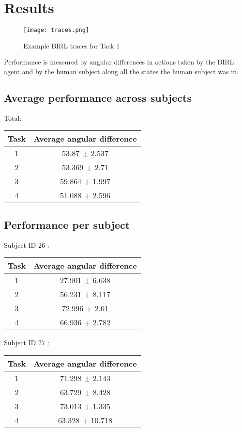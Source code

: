 \documentclass[12pt]{article}
\begin{document}
\section{Results}

\begin{figure}[h!]
    \centering
    \texttt{[image: traces.png]}
    \caption{Example BIRL traces for Task 1}
    \label{traces}
\end{figure}


Performance is measured by angular differences in actions taken by the BIRL agent and by the human subject along all the states the human subject was in. \par 

\subsection{Average performance across subjects}

Total: 
\begin{center}
\begin{tabular}{|c|c|}
\hline
 Task & Average angular difference \\ \hline
1  &  53.87 $\pm$ 2.537 \\
2  &  53.369 $\pm$ 2.71 \\
3  &  59.864 $\pm$ 1.997 \\
4  &  51.088 $\pm$ 2.596 \\
\hline
\end{tabular}
\end{center}

\subsection{Performance per subject}
\par Subject ID  26 :
\begin{center}
\begin{tabular}{|c|c|}
\hline
 Task & Average angular difference \\ \hline
1  &  27.901 $\pm$ 6.638 \\
2  &  56.231 $\pm$ 8.117 \\
3  &  72.996 $\pm$ 2.01 \\
4  &  66.936 $\pm$ 2.782 \\
\hline
\end{tabular}
\end{center}

\par Subject ID  27 :
\begin{center}
\begin{tabular}{|c|c|}
\hline
 Task & Average angular difference \\ \hline
1  &  71.298 $\pm$ 2.143 \\
2  &  63.729 $\pm$ 8.428 \\
3  &  73.013 $\pm$ 1.335 \\
4  &  63.328 $\pm$ 10.718 \\
\hline
\end{tabular}
\end{center}
\end{document}
